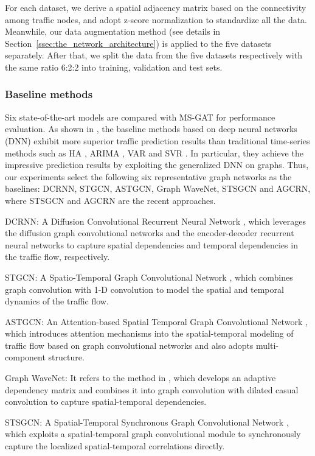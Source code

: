 For each dataset, we derive a spatial adjacency matrix based on the connectivity among traffic nodes, and adopt z-score normalization to standardize all the data. Meanwhile, our data augmentation method (see details in Section~\ref{ssec:the_network_architecture}) is applied to the five datasets separately. After that, we split the data from the five datasets respectively with the same ratio 6:2:2 into training, validation and test sets.

\subsubsection{Baseline methods}
Six state-of-the-art models are compared with MS-GAT for performance evaluation. As shown in \cite{song2020spatial,mengzhang2020spatial}, the baseline methods based on deep neural networks (DNN) exhibit more superior traffic prediction results than traditional time-series methods such as HA \cite{liu2004summary}, ARIMA \cite{williams2003modeling}, VAR \cite{zivot2006vector} and SVR \cite{1364002}. In particular, they achieve the impressive prediction results by exploiting the generalized DNN on graphs. Thus, our experiments select the following six representative graph networks as the baselines: DCRNN, STGCN, ASTGCN, Graph WaveNet, STSGCN and AGCRN, where STSGCN and AGCRN are the recent approaches.  

DCRNN: A Diffusion Convolutional Recurrent Neural Network \cite{li2017diffusion}, which leverages the diffusion graph convolutional networks and the encoder-decoder recurrent neural networks to capture spatial dependencies and temporal dependencies in the traffic flow, respectively.

STGCN: A Spatio-Temporal Graph Convolutional Network \cite{yu2017spatio}, which combines graph convolution with 1-D convolution to model the spatial and temporal dynamics of the traffic flow.

ASTGCN: An Attention-based Spatial Temporal Graph Convolutional Network \cite{guo2019attention}, which introduces attention mechanisms into the spatial-temporal modeling of traffic flow based on graph convolutional networks and also adopts multi-component structure.

Graph WaveNet: It refers to the method in \cite{wu2019graph}, which develops an adaptive dependency matrix and combines it into graph convolution with dilated casual convolution to capture spatial-temporal dependencies.

STSGCN: A Spatial-Temporal Synchronous Graph Convolutional Network \cite{song2020spatial}, which exploits a spatial-temporal graph convolutional module to synchronously capture the localized spatial-temporal correlations directly.

